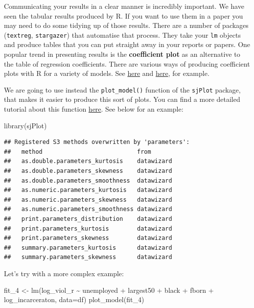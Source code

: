 \documentclass[
]{book}
\newenvironment{Shaded}{\begin{snugshade}}{\end{snugshade}}
\newcommand{\AttributeTok}[1]{\textcolor[rgb]{0.77,0.63,0.00}{#1}}
\newcommand{\FunctionTok}[1]{\textcolor[rgb]{0.00,0.00,0.00}{#1}}
\newcommand{\NormalTok}[1]{#1}
\newcommand{\OtherTok}[1]{\textcolor[rgb]{0.56,0.35,0.01}{#1}}
\newcommand{\SpecialCharTok}[1]{\textcolor[rgb]{0.00,0.00,0.00}{#1}}
\begin{document}
Communicating your results in a clear manner is incredibly important. We have seen the tabular results produced by R. If you want to use them in a paper you may need to do some tidying up of those results. There are a number of packages (\texttt{textreg}, \texttt{stargazer}) that automatise that process. They take your \texttt{lm} objects and produce tables that you can put straight away in your reports or papers. One popular trend in presenting results is the \textbf{coefficient plot} as an alternative to the table of regression coefficients. There are various ways of producing coefficient plots with R for a variety of models. See \href{http://www.carlislerainey.com/2012/06/30/coefficient-plots-in-r/}{here} and \href{http://www.carlislerainey.com/2012/07/03/an-improvement-to-coefficient-plots/}{here}, for example.

We are going to use instead the \texttt{plot\_model()} function of the \texttt{sjPlot} package, that makes it easier to produce this sort of plots. You can find a more detailed tutorial about this function \href{http://rpubs.com/sjPlot/sjplm}{here}. See below for an example:

\begin{Shaded}
\begin{Highlighting}[]
\FunctionTok{library}\NormalTok{(sjPlot)}
\end{Highlighting}
\end{Shaded}

\begin{verbatim}
## Registered S3 methods overwritten by 'parameters':
##   method                           from      
##   as.double.parameters_kurtosis    datawizard
##   as.double.parameters_skewness    datawizard
##   as.double.parameters_smoothness  datawizard
##   as.numeric.parameters_kurtosis   datawizard
##   as.numeric.parameters_skewness   datawizard
##   as.numeric.parameters_smoothness datawizard
##   print.parameters_distribution    datawizard
##   print.parameters_kurtosis        datawizard
##   print.parameters_skewness        datawizard
##   summary.parameters_kurtosis      datawizard
##   summary.parameters_skewness      datawizard
\end{verbatim}

Let's try with a more complex example:

\begin{Shaded}
\begin{Highlighting}[]
\NormalTok{fit\_4 }\OtherTok{\textless{}{-}} \FunctionTok{lm}\NormalTok{(log\_viol\_r }\SpecialCharTok{\textasciitilde{}}\NormalTok{ unemployed }\SpecialCharTok{+}\NormalTok{ largest50 }\SpecialCharTok{+}\NormalTok{ black }\SpecialCharTok{+}\NormalTok{ fborn }\SpecialCharTok{+}\NormalTok{ log\_incarceraton, }\AttributeTok{data=}\NormalTok{df)}
\FunctionTok{plot\_model}\NormalTok{(fit\_4)}
\end{Highlighting}
\end{Shaded}
\end{document}
